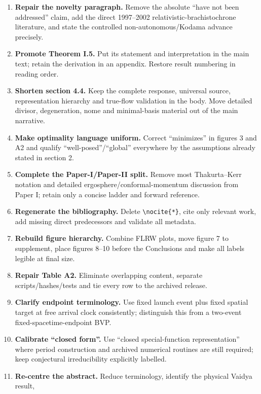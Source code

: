 \documentclass[11pt,a4paper]{article}
\begin{document}
\begin{enumerate}[label=\textbf{M\arabic*.}]
  \item \textbf{Repair the novelty paragraph.}  Remove the absolute ``have not been addressed''
  claim, add the direct 1997--2002 relativistic-brachistochrone literature, and state the controlled
  non-autonomous/Kodama advance precisely.
  \item \textbf{Promote Theorem I.5.}  Put its statement and interpretation in the main text;
  retain the derivation in an appendix.  Restore result numbering in reading order.
  \item \textbf{Shorten section 4.4.}  Keep the complete response, universal source, representation
  hierarchy and true-flow validation in the body.  Move detailed divisor, degeneration, nome and
  minimal-basis material out of the main narrative.
  \item \textbf{Make optimality language uniform.}  Correct ``minimizes'' in figures 3 and A2 and
  qualify ``well-posed''/``global'' everywhere by the assumptions already stated in section 2.
  \item \textbf{Complete the Paper-I/Paper-II split.}  Remove most Thakurta--Kerr notation and
  detailed ergosphere/conformal-momentum discussion from Paper I; retain only a concise ladder and
  forward reference.
  \item \textbf{Regenerate the bibliography.}  Delete \verb|\nocite{*}|, cite only relevant work,
  add missing direct predecessors and validate all metadata.
  \item \textbf{Rebuild figure hierarchy.}  Combine FLRW plots, move figure 7 to supplement, place
  figures 8--10 before the Conclusions and make all labels legible at final size.
  \item \textbf{Repair Table A2.}  Eliminate overlapping content, separate scripts/hashes/tests and
  tie every row to the archived release.
  \item \textbf{Clarify endpoint terminology.}  Use fixed launch event plus fixed spatial target at
  free arrival clock consistently; distinguish this from a two-event fixed-spacetime-endpoint BVP.
  \item \textbf{Calibrate ``closed form''.}  Use ``closed special-function representation'' where
  period construction and archived numerical routines are still required; keep conjectural
  irreducibility explicitly labelled.
  \item \textbf{Re-centre the abstract.}  Reduce terminology, identify the physical Vaidya result,

\end{enumerate}
\end{document}
